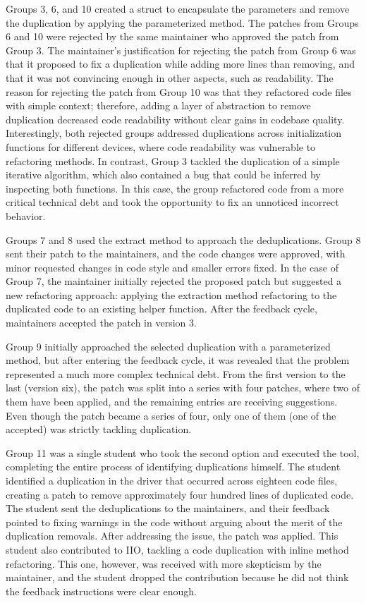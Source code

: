 \documentclass[10pt,conference]{IEEEtran}
\begin{document}
Groups 3, 6, and 10 created a struct to encapsulate the parameters and remove the duplication by applying the parameterized method. The patches from Groups 6 and 10 were rejected by the same maintainer who approved the patch from Group 3. The maintainer's justification for rejecting the patch from Group 6 was that it proposed to fix a duplication while adding more lines than removing, and that it was not convincing enough in other aspects, such as readability. The reason for rejecting the patch from Group 10 was that they refactored code files with simple context; therefore, adding a layer of abstraction to remove duplication decreased code readability without clear gains in codebase quality. Interestingly, both rejected groups addressed duplications across initialization functions for different devices, where code readability was vulnerable to refactoring methods. In contrast, Group 3 tackled the duplication of a simple iterative algorithm, which also contained a bug that could be inferred by inspecting both functions. In this case, the group refactored code from a more critical technical debt and took the opportunity to fix an unnoticed incorrect behavior.

Groups 7 and 8 used the extract method to approach the deduplications. Group 8 sent their patch to the maintainers, and the code changes were approved, with minor requested changes in code style and smaller errors fixed. In the case of Group 7, the maintainer initially rejected the proposed patch but suggested a new refactoring approach: applying the extraction method refactoring to the duplicated code to an existing helper function. After the feedback cycle, maintainers accepted the patch in version 3.

Group 9 initially approached the selected duplication with a parameterized method, but after entering the feedback cycle, it was revealed that the problem represented a much more complex technical debt. From the first version to the last (version six), the patch was split into a series with four patches, where two of them have been applied, and the remaining entries are receiving suggestions. Even though the patch became a series of four, only one of them (one of the accepted) was strictly tackling duplication.

Group 11 was a single student who took the second option and executed the tool, completing the entire process of identifying duplications himself. The student identified a duplication in the driver that occurred across eighteen code files, creating a patch to remove approximately four hundred lines of duplicated code. The student sent the deduplications to the maintainers, and their feedback pointed to fixing warnings in the code without arguing about the merit of the duplication removals. After addressing the issue, the patch was applied. This student also contributed to IIO, tackling a code duplication with inline method refactoring. This one, however, was received with more skepticism by the maintainer, and the student dropped the contribution because he did not think the feedback instructions were clear enough.
\end{document}
